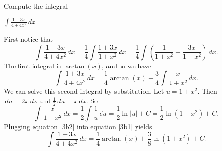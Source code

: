 \documentclass[nooutcomes]{ximera}
\renewcommand{\d}{\,d}
\renewenvironment{freeResponse}{
\ifhandout\setbox0\vbox\bgroup\else
\begin{trivlist}\item[\hskip \labelsep\bfseries Solution:\hspace{2ex}]
\fi}
{\ifhandout\egroup\else
\end{trivlist}
\fi}
\begin{document}
\begin{problem}
Compute the integral

		
		
		
	  $ \int \frac{1+3x}{4+4x^2} \d x$
		\begin{freeResponse}
		First notice that
			\begin{equation*}
			\int \frac{1+3x}{4+4x^2} \d x = \frac{1}{4} \int \frac{1+3x}{1+x^2} \d x = \frac{1}{4} \int \left( \frac{1}{1+x^2} + \frac{3x}{1+x^2} \right) \d x.
			\end{equation*}
		The first integral is $\arctan(x)$, and so we have
			\begin{equation}\label{3b1}
			\int \frac{1+3x}{4+4x^2} \d x = \frac{1}{4} \arctan(x) + \frac{3}{4} \int \frac{x}{1+x^2} \d x.
			\end{equation}
		We can solve this second integral by substitution.  Let $u=1+x^2$.  Then $\d u = 2x \d x$ and $\frac{1}{2} \d u = x \d x$.  So
			\begin{equation}\label{3b2}
			\int \frac{x}{1+x^2} \d x = \frac{1}{2} \int \frac{1}{u} \d u = \frac{1}{2} \ln|u| +C = \frac{1}{2} \ln(1+x^2) + C.
			\end{equation}
		Plugging equation \eqref{3b2} into equation \eqref{3b1} yields
			\begin{equation*}
			\int \frac{1+3x}{4+4x^2} \d x = \frac{1}{4} \arctan(x) + \frac{3}{8} \ln(1+x^2) + C.
			\end{equation*}
		\end{freeResponse}
		
		
		
	
			
			
		
\end{problem}
\end{document}
